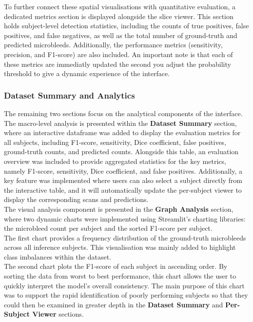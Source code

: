 \documentclass{aifyp}
\begin{document}
To further connect these spatial visualisations with quantitative evaluation, a dedicated metrics section is displayed alongside the slice viewer. This section holds subject-level detection statistics, including the counts of true positives, false positives, and false negatives, as well as the total number of ground-truth and predicted microbleeds. Additionally, the performance metrics (sensitivity, precision, and F1-score) are also included. An important note is that each of these metrics are immediatly updated the second you adjust the probability threshold to give a dynamic experience of the interface.

\subsubsection{Dataset Summary and Analytics}
\label{ss:dataset_summ_analytics}
The remaining two sections focus on the analytical components of the interface.
\\

The macro-level analysis is presented within the \textbf{Dataset Summary} section, where an interactive dataframe was added to display the evaluation metrics for all subjects, including F1-score, sensitivity, Dice coefficient, false positives, ground-truth counts, and predicted counts. Alongside this table, an evaluation overview was included to provide aggregated statistics for the key metrics, namely F1-score, sensitivity, Dice coefficient, and false positives. Additionally, a key feature was implemented where users can also select a subject directly from the interactive table, and it will automatically update the per-subject viewer to display the corresponding scans and predictions.
\\

The visual analysis component is presented in the \textbf{Graph Analysis} section, where two dynamic charts were implemented using Streamlit's charting libraries: the microbleed count per subject and the sorted F1-score per subject.
\\

The first chart provides a frequency distribution of the ground-truth microbleeds across all inference subjects. This visualisation was mainly added to highlight class imbalances within the dataset.
\\

The second chart plots the F1-score of each subject in ascending order. By sorting the data from worst to best performance, this chart allows the user to quickly interpret the model's overall consistency. The main purpose of this chart was to support the rapid identification of poorly performing subjects so that they could then be examined in greater depth in the \textbf{Dataset Summary} and \textbf{Per-Subject Viewer} sections.
\end{document}
